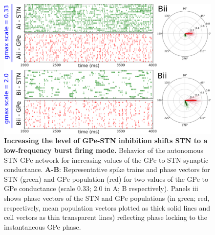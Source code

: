 \begin{figure}
\centering
\includegraphics[width=\textwidth]{ch_detailed_model/figs_split/fig_endogenous_sweep-gmax-gpe-stn_B-rasters.png}
\caption{
\textbf{Increasing the level of GPe-STN inhibition shifts STN to a low-frequency burst firing mode.}
Behavior of the autonomous STN-GPe network for increasing values of the GPe to STN synaptic conductance.
\textbf{A-B}: Representative spike trains and phase vectors for STN (green) and GPe population (red) for two values of the GPe to GPe conductance (scale 0.33; 2.0 in A; B respectively). Panels iii shows phase vectors of the STN and GPe populations (in green; red, respectively, mean population vectors plotted as thick solid lines and cell vectors as thin transparent lines) reflecting phase locking to the instantaneous GPe phase.
}
\label{fig:endogenous_sweep-gmax-gpe-stn_B-rasters-vectors}
\end{figure}

